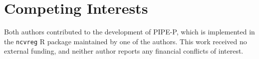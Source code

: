 \section{Competing Interests}

Both authors contributed to the development of PIPE-P, which is implemented in the \texttt{ncvreg} R package maintained by one of the authors. This work received no external funding, and neither author reports any financial conflicts of interest.